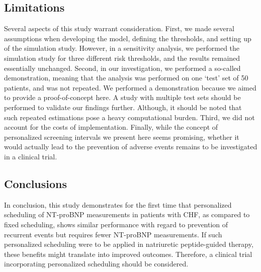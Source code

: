 \subsection{Limitations}
Several aspects of this study warrant consideration. First, we made several assumptions when developing the model, defining the thresholds, and setting up of the simulation study. However, in a sensitivity analysis, we performed the simulation study for three different risk thresholds, and the results remained essentially unchanged. Second, in our investigation, we performed a so-called demonstration, meaning that the analysis was performed on one `test' set of 50 patients, and was not repeated. We performed a demonstration because we aimed to provide a proof-of-concept here. A study with multiple test sets should be performed to validate our findings further. Although, it should be noted that such repeated estimations pose a heavy computational burden. Third, we did not account for the costs of implementation. Finally, while the concept of personalized screening intervals we present here seems promising, whether it would actually lead to the prevention of adverse events remains to be investigated in a clinical trial.

\subsection{Conclusions}
In conclusion, this study demonstrates for the first time that personalized scheduling of NT-proBNP measurements in patients with CHF, as compared to fixed scheduling, shows similar performance with regard to prevention of recurrent events but requires fewer NT-proBNP measurements. If such personalized scheduling were to be applied in natriuretic peptide-guided therapy, these benefits might translate into improved outcomes. Therefore, a clinical trial incorporating personalized scheduling should be considered.